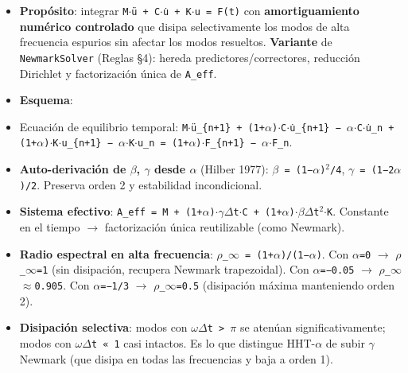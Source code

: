 \documentclass[11pt,letterpaper,oneside]{report}
\begin{document}
\begin{itemize}
  \item \textbf{Propósito}: integrar \texttt{M\ensuremath{\cdot}ü + C\ensuremath{\cdot}u̇ + K\ensuremath{\cdot}u = F(t)} con \textbf{amortiguamiento numérico controlado} que disipa selectivamente los modos de alta frecuencia espurios sin afectar los modos resueltos. \textbf{Variante} de \texttt{NewmarkSolver} (Reglas §4): hereda predictores/correctores, reducción Dirichlet y factorización única de \texttt{A\_eff}.
  \item \textbf{Esquema}:
  \item Ecuación de equilibrio temporal: \texttt{M\ensuremath{\cdot}ü\_\{n+1\} + (1+\ensuremath{\alpha})\ensuremath{\cdot}C\ensuremath{\cdot}u̇\_\{n+1\} − \ensuremath{\alpha}\ensuremath{\cdot}C\ensuremath{\cdot}u̇\_n + (1+\ensuremath{\alpha})\ensuremath{\cdot}K\ensuremath{\cdot}u\_\{n+1\} − \ensuremath{\alpha}\ensuremath{\cdot}K\ensuremath{\cdot}u\_n = (1+\ensuremath{\alpha})\ensuremath{\cdot}F\_\{n+1\} − \ensuremath{\alpha}\ensuremath{\cdot}F\_n}.
  \item \textbf{Auto-derivación de \ensuremath{\beta}, \ensuremath{\gamma} desde \ensuremath{\alpha}} (Hilber 1977): \texttt{\ensuremath{\beta} = (1−\ensuremath{\alpha})\ensuremath{^{2}}/4}, \texttt{\ensuremath{\gamma} = (1−2\ensuremath{\alpha})/2}. Preserva orden 2 y estabilidad incondicional.
  \item \textbf{Sistema efectivo}: \texttt{A\_eff = M + (1+\ensuremath{\alpha})\ensuremath{\cdot}\ensuremath{\gamma}\ensuremath{\Delta}t\ensuremath{\cdot}C + (1+\ensuremath{\alpha})\ensuremath{\cdot}\ensuremath{\beta}\ensuremath{\Delta}t\ensuremath{^{2}}\ensuremath{\cdot}K}. Constante en el tiempo \ensuremath{\to} factorización única reutilizable (como Newmark).
  \item \textbf{Radio espectral en alta frecuencia}: \texttt{\ensuremath{\rho}\_\ensuremath{\infty} = (1+\ensuremath{\alpha})/(1−\ensuremath{\alpha})}. Con \texttt{\ensuremath{\alpha}=0} \ensuremath{\to} \texttt{\ensuremath{\rho}\_\ensuremath{\infty}=1} (sin disipación, recupera Newmark trapezoidal). Con \texttt{\ensuremath{\alpha}=−0.05} \ensuremath{\to} \texttt{\ensuremath{\rho}\_\ensuremath{\infty}\ensuremath{\approx}0.905}. Con \texttt{\ensuremath{\alpha}=−1/3} \ensuremath{\to} \texttt{\ensuremath{\rho}\_\ensuremath{\infty}=0.5} (disipación máxima manteniendo orden 2).
  \item \textbf{Disipación selectiva}: modos con \texttt{\ensuremath{\omega}\ensuremath{\Delta}t > \ensuremath{\pi}} se atenúan significativamente; modos con \texttt{\ensuremath{\omega}\ensuremath{\Delta}t « 1} casi intactos. Es lo que distingue HHT-\ensuremath{\alpha} de subir \ensuremath{\gamma} Newmark (que disipa en todas las frecuencias y baja a orden 1).

\end{itemize}
\end{document}
